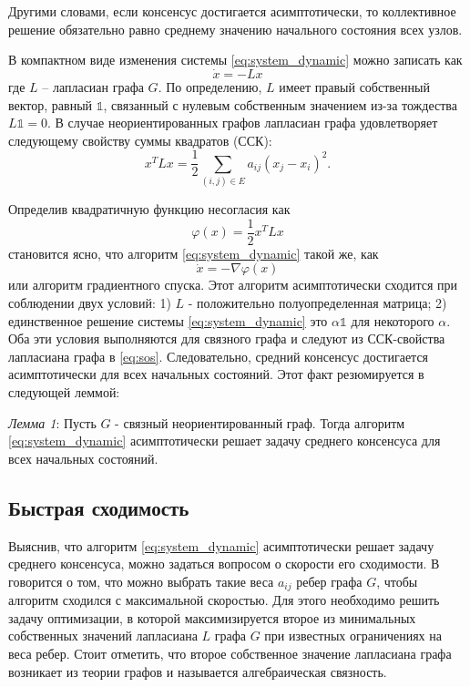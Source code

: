 \documentclass[a4paper,article,14pt]{extarticle}
\begin{document}
Другими словами, если консенсус достигается асимптотически, то коллективное решение обязательно равно среднему значению начального состояния всех узлов.

В компактном виде изменения системы \ref{eq:system_dynamic} можно записать как
\begin{equation}
\dot x = -Lx
\end{equation}
где $L$ -- лапласиан графа $G$. По определению, $L$ имеет правый собственный вектор, равный $\mathds{1}$, связанный с нулевым собственным значением из-за тождества $L\mathds{1} = 0$. В случае неориентированных графов лапласиан графа удовлетворяет следующему свойству суммы квадратов (ССК):
\begin{equation} \label{eq:sos}
x^TLx = \frac{1}{2}\sum_{(i, j) \in E} a_{ij}(x_j-x_i)^2.
\end{equation}

Определив квадратичную функцию несогласия как
\begin{equation}
\varphi(x) = \frac{1}{2}x^TLx
\end{equation}
становится ясно, что алгоритм \ref{eq:system_dynamic} такой же, как
\begin{equation}
\dot x = -\nabla \varphi(x)
\end{equation}
или алгоритм градиентного спуска. Этот алгоритм асимптотически сходится при соблюдении двух условий: 1) $L$ - положительно полуопределенная матрица; 2) единственное решение системы \ref{eq:system_dynamic} это $\alpha \mathds{1}$ для некоторого $\alpha$. Оба эти условия выполняются для связного графа и следуют из ССК-свойства лапласиана графа в \ref{eq:sos}. Следовательно, средний консенсус достигается асимптотически для всех начальных состояний. Этот факт резюмируется в \cite{consensus_basics} следующей леммой:

\textit{Лемма 1}: Пусть $G$ - связный неориентированный граф. Тогда алгоритм \ref{eq:system_dynamic} асимптотически решает задачу среднего консенсуса для всех начальных состояний.

\subsection{Быстрая сходимость}
Выяснив, что алгоритм \ref{eq:system_dynamic} асимптотически решает задачу среднего консенсуса, можно задаться вопросом о скорости его сходимости. В \cite{fast_averaging} говорится о том, что можно выбрать такие веса $a_{ij}$ ребер графа $G$, чтобы алгоритм сходился с максимальной скоростью. Для этого необходимо решить задачу оптимизации, в которой максимизируется второе из минимальных собственных значений лапласиана $L$ графа $G$ при известных ограничениях на веса ребер. Стоит отметить, что второе собственное значение лапласиана графа возникает из теории графов и называется алгебраическая связность.
\end{document}
